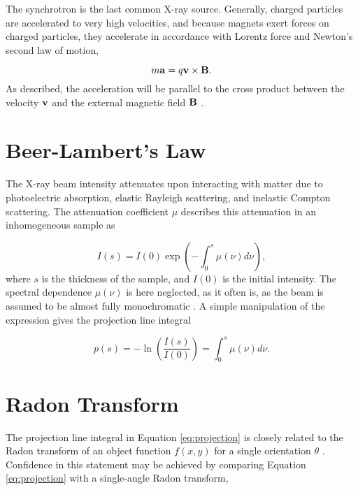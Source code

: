 The synchrotron is the last common X-ray source.
Generally, charged particles are accelerated to very high velocities, and because magnets exert forces on charged particles, they accelerate in accordance with
Lorentz force and Newton's second law of motion,

\begin{equation}\label{eq:Lorentz_force}
    m\bm{\mathrm{a}} = q \bm{\mathrm{v}} \times \bm{\mathrm{B}}.
\end{equation}
As described, the acceleration will be parallel to the cross product between the velocity $\bm{\mathrm{v}}$ and the external magnetic field $\bm{\mathrm{B}}$ \cite{crater1994general}. %


\section{Beer-Lambert's Law}
The X-ray beam intensity attenuates upon interacting with matter due to photoelectric absorption, elastic Rayleigh scattering, and inelastic Compton scattering.
The attenuation coefficient $\mu$ describes this attenuation in an inhomogeneous sample as

\begin{equation}
    I(s) = I(0) \exp(- \int_{0}^{s} \mu(\nu) d\nu),
\end{equation}
\noindent
where $s$ is the thickness of the sample, and $I(0)$ is the initial intensity. The spectral dependence $\mu(\nu)$ is here neglected, as it often is, as the beam is assumed to be almost fully monochromatic \cite{buzug2009computed}.
A simple manipulation of the expression gives the projection line integral

\begin{equation}\label{eq:projection}
    p(s) = -\ln(\frac{I(s)}{I(0)} ) = \int_{0}^{s} \mu(\nu) d\nu.
\end{equation}

\section{Radon Transform}
The projection line integral in Equation \eqref{eq:projection} is closely related to the Radon transform of an object function $f(x,y)$ for a single orientation $\theta$ \cite{zeng2010medical}.
Confidence in this statement may be achieved by comparing Equation \eqref{eq:projection} with a single-angle Radon transform,

